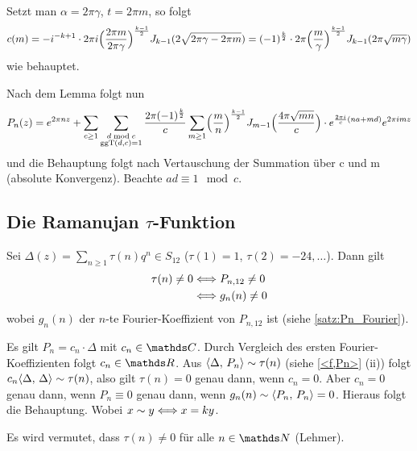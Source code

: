 \begin{bewe}
\begin{bewe}
Setzt man $\alpha = 2\pi \gamma$, $t = 2\pi m$, so folgt
\[
c(m) = -i^{-k+1} \cdot 2\pi i \Bigl( \frac{2\pi m}{2\pi \gamma}\Bigr)^{\frac{k-1}{2}} J_{k-1} (2\sqrt{2\pi \gamma - 2 \pi m}) = (-1)^{\frac{k}{2}} \cdot 2\pi \Bigl(\frac{m}{\gamma}\Bigr)^{\frac{k-1}{2}} J_{k-1} (2\pi \sqrt{m\gamma})
\]
wie behauptet.


\end{bewe}

Nach dem Lemma folgt nun
\[
P_n(z) = e^{2\pi nz} + \sum_{c\geq1} \sum_{\substack{d \bmod c\\ \operatorname{ggT}(d,c) = 1}} \frac{2\pi (-1)^{\frac{k}{2}}}{c} \sum_{m\geq 1} \Bigl(\frac{m}{n}\Bigr)^{\frac{k-1}{2}} J_{m-1} \Bigl(\frac{4\pi \sqrt{mn}}{c}\Bigr) \cdot e^{\frac{2\pi i}{c}(na+md)} e^{2\pi imz}
\]
und die Behauptung folgt nach Vertauschung der Summation über c und m (absolute Konvergenz). Beachte $ad \equiv 1 \mod c$.

\end{bewe}

\subsection[Die Ramanujan \texorpdfstring{$\tau$}{tau}-Funktion]{Die Ramanujan {\boldmath $\tau$}-Funktion}

\begin{satz}
Sei $\Delta(z) = \sum_{n \geq 1} \tau(n) q^n \in S_{12}$ ($\tau(1) = 1$, $\tau(2) = -24, \ldots $).
Dann gilt
\begin{align*}
\tau(n) \not= 0
&\Longleftrightarrow P_{n,12} \not= 0 \\
&\Longleftrightarrow g_n(n) \not= 0
\end{align*}
wobei $g_n(n)$ der $n$-te Fourier-Koeffizient von $P_{n,12}$ ist (siehe \autoref{satz:Pn_Fourier}).
\end{satz}
\begin{bewe}
Es gilt $P_n = c_n \cdot \Delta$ mit $c_n \in \CC$.
Durch Vergleich des ersten Fourier-Koeffizienten folgt $c_n \in \RR$.
Aus $\scalarprd{\Delta}{P_n} \sim \tau(n)$ (siehe \autoref{<f,Pn>} (ii)) folgt $c_n \scalarprd \Delta \Delta \sim \tau(n)$, also gilt $\tau(n) = 0$ genau dann, wenn $c_n = 0$. Aber $c_n = 0$ genau dann, wenn $P_n \equiv 0$ genau dann, wenn $g_n(n) \sim \scalarprd{P_n}{P_n} = 0$.
Hieraus folgt die Behauptung.
Wobei $x \sim y \Longleftrightarrow x = ky$.
\end{bewe}

\begin{beme}
Es wird vermutet, dass $\tau(n) \not= 0$ für alle $n\in\NN$ (Lehmer).
\end{beme}

